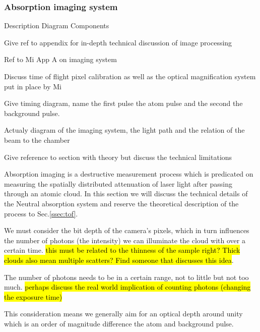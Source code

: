 \subsubsection{Absorption imaging system}

Description
Diagram
Components

Give ref to appendix for in-depth technical discussion of image processing

Ref to Mi App A on imaging system

Discuss time of flight pixel calibration as well as the optical magnification system put in place by Mi

Give timing diagram, name the first pulse the atom pulse and the second the background pulse.

Actualy diagram of the imaging system, the light path and the relation of the beam to the chamber

Give reference to section with theory but discuss the technical limitations
 
Absorption imaging is a destructive measurement process which is predicated on measuring the spatially distributed attenuation of laser light after passing through an atomic cloud. In this section we will discuss the technical details of the Neutral absorption system and reserve the theoretical description of the process to Sec.\ref{ssec:tof}. 

We must consider the bit depth of the camera's pixels, which in turn influences the number of photons (the intensity) we can illuminate the cloud with over a certain time. \hl{this must be related to the thinness of the sample right? Thick clouds also mean multiple scatters? Find someone that discusses this idea}.
 
The number of photons needs to be in a certain range, not to little but not too much. \hl{perhaps discuss the real world implication of counting photons (changing the exposure time)} 

This consideration means we generally aim for an optical depth around unity which is an order of magnitude difference the atom and background pulse. 

